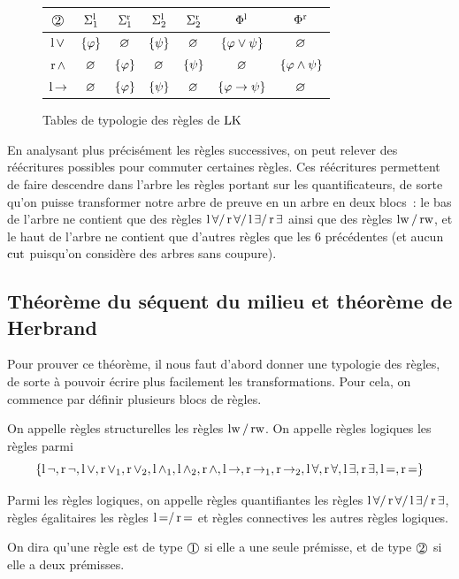 \begin{figure}[t]
{    \quad
    \begin{tabular}{|c|c|c|c|c|c|c|}
      \hline
      $\rTwo$ & $\Sigma^{\mathrm{l}}_1$ & $\Sigma^{\mathrm{r}}_1$ & $\Sigma^{\mathrm{l}}_2$ & $\Sigma^{\mathrm{r}}_2$ &
      $\Phi^{\mathrm{l}}$ & $\Phi^{\mathrm{r}}$ \\
      \hline
      $\operatorname{l}\mathord{\lor}$ & $\{\varphi\}$ & $\varnothing$ & $\{\psi\}$ & $\varnothing$ &
      $\{\varphi \lor \psi\}$ & $\varnothing$ \\
      $\operatorname{r}\mathord{\land}$ & $\varnothing$ & $\{\varphi\}$ & $\varnothing$ &
      $\{\psi\}$ & $\varnothing$ & $\{\varphi\land \psi\}$ \\
      $\operatorname{l}\mathord{\to}$ & $\varnothing$ & $\{\varphi\}$ & $\{\psi\}$ & $\varnothing$ &
      $\{\varphi\to\psi\}$ & $\varnothing$\\
      \hline
    \end{tabular}
  }
  \caption{Tables de typologie des règles de $\operatorname{LK}$}
  \label{fig.typologie1}
\end{figure}

En analysant plus précisément les règles successives, on peut relever des
réécritures possibles pour commuter certaines règles. Ces réécritures permettent
de \og faire descendre dans l'arbre \fg les règles portant sur les
quantificateurs, de sorte qu'on puisse transformer notre arbre de preuve en
un arbre en deux blocs~: le bas de l'arbre ne contient que des règles
$\operatorname{l}\mathord{\forall} / \operatorname{r}\mathord{\forall} / \operatorname{l}\mathord{\exists} / \operatorname{r}\mathord{\exists}$ ainsi que des règles $\operatorname{lw} / \operatorname{rw}$,
et le haut de l'arbre ne contient que d'autres règles que les $6$ précédentes
(et aucun $\operatorname{cut}$ puisqu'on considère des arbres sans coupure).

\subsection[Théorème de Herbrand]{Théorème du séquent du milieu et
  théorème de Herbrand}

Pour prouver ce théorème, il nous faut d'abord donner une typologie des règles,
de sorte à pouvoir écrire plus facilement les transformations. Pour cela, on
commence par définir plusieurs blocs de règles.

\begin{definition}
  On appelle règles structurelles les règles $\operatorname{lw}/\operatorname{rw}$. On appelle règles
  logiques les règles parmi
  \[\{\operatorname{l}\mathord{\lnot},\operatorname{r}\mathord{\lnot},\operatorname{l}\mathord{\lor},\operatorname{r}\mathord{\lor}_{1},\operatorname{r}\mathord{\lor}_{2},\operatorname{l}\mathord{\land}_{1},\operatorname{l}\mathord{\land}_{2},\operatorname{r}\mathord{\land},
  \operatorname{l}\mathord{\to},\operatorname{r}\mathord{\to}_{1},\operatorname{r}\mathord{\to}_{2},\operatorname{l}\mathord{\forall},\operatorname{r}\mathord{\forall},\operatorname{l}\mathord{\exists},\operatorname{r}\mathord{\exists},\operatorname{l}{\mathord{=}},\operatorname{r}\mathord{=}\}\]

  Parmi les règles logiques, on appelle règles quantifiantes les règles
  $\operatorname{l}\mathord{\forall}/\operatorname{r}\mathord{\forall}/\operatorname{l}\mathord{\exists}/\operatorname{r}\mathord{\exists}$, règles égalitaires les règles $\operatorname{l}{\mathord{=}}/\operatorname{r}\mathord{=}$
  et règles connectives les autres règles logiques.

  On dira qu'une règle est de type $\rOne$ si elle a une seule prémisse, et
  de type $\rTwo$ si elle a deux prémisses.
\end{definition}

